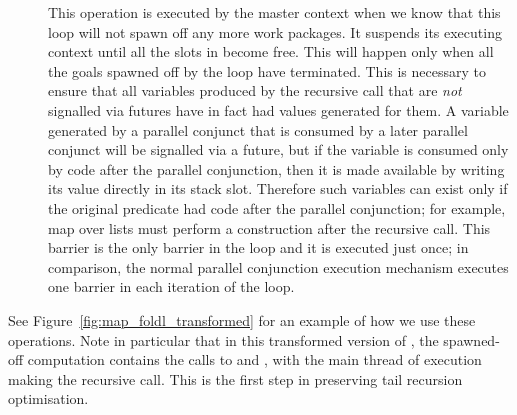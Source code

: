\begin{description}
\item[]
This operation is executed by the master context when we know
that this loop will not spawn off any more work packages.
It suspends its executing context
until all the slots in \LC{} become free.
This will happen only when all the goals spawned off by the loop
have terminated.
This is necessary to ensure that
all variables produced by the recursive call
that are \emph{not} signalled via futures
have in fact had values generated for them.
A variable generated by a parallel conjunct
that is consumed by a later parallel conjunct will be signalled via a future,
but if the variable is consumed only by code after the parallel conjunction,
then it is made available by writing its value directly in its stack
slot.
Therefore such variables can exist
only if the original predicate had code after the parallel conjunction;
for example, map over lists
must perform a construction after the recursive call.
This barrier is the only barrier in the loop and it is executed just once;
in comparison, the normal parallel conjunction execution mechanism
executes one barrier in each iteration of the loop.
\end{description}


\noindent
See Figure~\ref{fig:map_foldl_transformed}
for an example of how we use these operations.
Note in particular that in this transformed version of \mapfoldl{},
the spawned-off computation contains the calls to  and ,
with the main thread of execution making the recursive call.
This is the first step in preserving tail recursion optimisation.



